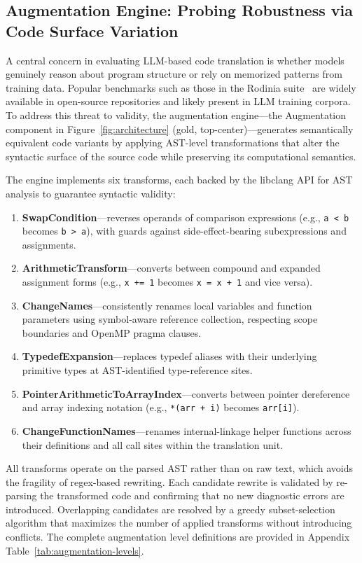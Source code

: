 \documentclass[conference]{IEEEtran}
\begin{document}
\subsection{Augmentation Engine: Probing Robustness via Code Surface Variation}
\label{sec:augmentation-engine}

A central concern in evaluating LLM-based code translation is whether models genuinely reason about program structure or rely on memorized patterns from training data. Popular benchmarks such as those in the Rodinia suite~\cite{Rodinia2009} are widely available in open-source repositories and likely present in LLM training corpora. To address this threat to validity, the augmentation engine---the Augmentation component in Figure~\ref{fig:architecture} (gold, top-center)---generates semantically equivalent code variants by applying AST-level transformations that alter the syntactic surface of the source code while preserving its computational semantics.

The engine implements six transforms, each backed by the libclang API for AST analysis to guarantee syntactic validity:

\begin{enumerate}
\item \textbf{SwapCondition}---reverses operands of comparison expressions (e.g., \texttt{a < b} becomes \texttt{b > a}), with guards against side-effect-bearing subexpressions and assignments.
\item \textbf{ArithmeticTransform}---converts between compound and expanded assignment forms (e.g., \texttt{x += 1} becomes \texttt{x = x + 1} and vice versa).
\item \textbf{ChangeNames}---consistently renames local variables and function parameters using symbol-aware reference collection, respecting scope boundaries and OpenMP pragma clauses.
\item \textbf{TypedefExpansion}---replaces typedef aliases with their underlying primitive types at AST-identified type-reference sites.
\item \textbf{PointerArithmeticToArrayIndex}---converts between pointer dereference and array indexing notation (e.g., \texttt{*(arr + i)} becomes \texttt{arr[i]}).
\item \textbf{ChangeFunctionNames}---renames internal-linkage helper functions across their definitions and all call sites within the translation unit.
\end{enumerate}

All transforms operate on the parsed AST rather than on raw text, which avoids the fragility of regex-based rewriting. Each candidate rewrite is validated by re-parsing the transformed code and confirming that no new diagnostic errors are introduced. Overlapping candidates are resolved by a greedy subset-selection algorithm that maximizes the number of applied transforms without introducing conflicts.
The complete augmentation level definitions are provided in Appendix Table~\ref{tab:augmentation-levels}.
\end{document}

